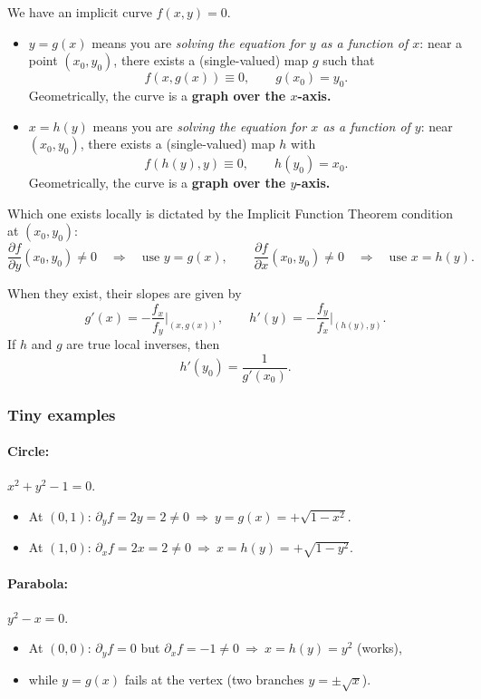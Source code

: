 \documentclass[12pt,a4paper]{article}
\theoremstyle{plain}
\theoremstyle{definition}
\theoremstyle{remark}
\theoremstyle{remark}
\begin{document}
	We have an implicit curve $f(x,y)=0$.
	
	\begin{itemize}
		\item $y=g(x)$ means you are \emph{solving the equation for $y$ as a function of $x$}:
		near a point $(x_0,y_0)$, there exists a (single-valued) map $g$ such that
		\[
		f(x,g(x)) \equiv 0, \qquad g(x_0)=y_0.
		\]
		Geometrically, the curve is a \textbf{graph over the $x$-axis.}
		
		\item $x=h(y)$ means you are \emph{solving the equation for $x$ as a function of $y$}:
		near $(x_0,y_0)$, there exists a (single-valued) map $h$ with
		\[
		f(h(y),y) \equiv 0, \qquad h(y_0)=x_0.
		\]
		Geometrically, the curve is a \textbf{graph over the $y$-axis.}
	\end{itemize}
	
	Which one exists locally is dictated by the Implicit Function Theorem condition at $(x_0,y_0)$:
	\[
	\frac{\partial f}{\partial y}(x_0,y_0)\neq 0 \quad\Rightarrow\quad \text{use } y=g(x),
	\qquad
	\frac{\partial f}{\partial x}(x_0,y_0)\neq 0 \quad\Rightarrow\quad \text{use } x=h(y).
	\]
	
	When they exist, their slopes are given by
	\[
	g'(x) = -\frac{f_x}{f_y}\Big|_{(x,g(x))}, 
	\qquad
	h'(y) = -\frac{f_y}{f_x}\Big|_{(h(y),y)}.
	\]
	If $h$ and $g$ are true local inverses, then 
	\[
	h'(y_0)=\frac{1}{g'(x_0)}.
	\]
	
	\subsubsection*{Tiny examples}
	
	\paragraph{Circle:} $x^2 + y^2 - 1 = 0.$
	\begin{itemize}
		\item At $(0,1)$: $\partial_y f = 2y = 2 \neq 0 \ \Rightarrow\ y = g(x) = +\sqrt{1 - x^2}.$
		\item At $(1,0)$: $\partial_x f = 2x = 2 \neq 0 \ \Rightarrow\ x = h(y) = +\sqrt{1 - y^2}.$
	\end{itemize}
	
	\paragraph{Parabola:} $y^2 - x = 0.$
	\begin{itemize}
		\item At $(0,0)$: $\partial_y f = 0$ but $\partial_x f = -1 \neq 0 \ \Rightarrow\ 
		x = h(y) = y^2$ (works),
		\item while $y = g(x)$ fails at the vertex (two branches $y=\pm\sqrt{x}$).
	\end{itemize}
	
\end{document}
